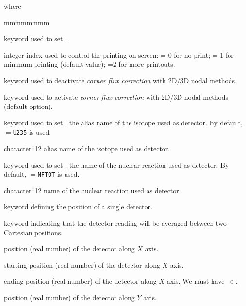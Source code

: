 \noindent where
\begin{ListeDeDescription}{mmmmmmmm}

\item[\moc{EDIT}] keyword used to set .

\item[\dusa{iprint}] integer index used to control the printing on screen:
 = 0 for no print; = 1 for minimum printing (default value); =2 for more printouts.

\item[\moc{NOCCOR}] keyword used to deactivate {\sl corner flux correction} with 2D/3D nodal methods.

\item[\moc{CCOR}] keyword used to activate {\sl corner flux correction} with 2D/3D nodal methods (default option).

\item[\moc{DETNAME}] keyword used to set , the alias name of the isotope used as detector. By default, $=${\tt U235} is used.

\item[\dusa{dname}] character*12 alias name of the isotope used as detector.

\item[\moc{REANAME}] keyword used to set , the name of the nuclear reaction used as detector. By default, $=${\tt NFTOT} is used.

\item[\dusa{rname}] character*12 name of the nuclear reaction used as detector.

\item[\moc{POSITION}] keyword defining the position of a single detector.

\item[\moc{INTEG}] keyword indicating that the detector reading will be averaged between two Cartesian positions.

\item[\dusa{valx}] position (real number) of the detector along $X$ axis.

\item[\dusa{valx1}] starting position (real number) of the detector along $X$ axis.

\item[\dusa{valx2}] ending position (real number) of the detector along $X$ axis. We must have $<$.
 
\item[\dusa{valy}] position (real number) of the detector along $Y$ axis.


\end{ListeDeDescription}
